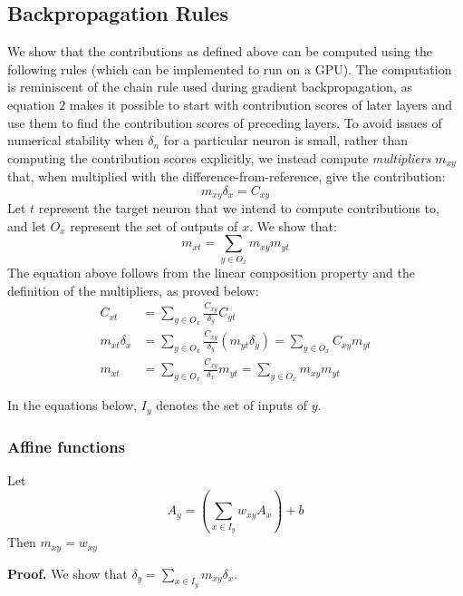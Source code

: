 \documentclass{article}
\begin{document}
\subsection{Backpropagation Rules}

We show that the contributions as defined above can be computed using the following rules (which can be implemented to run on a GPU). The computation is reminiscent of the chain rule used during gradient backpropagation, as equation $2$ makes it possible to start with contribution scores of later layers and use them to find the contribution scores of preceding layers. To avoid issues of numerical stability when $\delta_n$ for a particular neuron is small, rather than computing the contribution scores explicitly, we instead compute \emph{multipliers} $m_{xy}$ that, when multiplied with the difference-from-reference, give the contribution:
\begin{equation}
m_{xy} \delta_x = C_{xy}
\end{equation} 
Let $t$ represent the target neuron that we intend to compute contributions to, and let $O_x$ represent the set of outputs of $x$. We show that:
\begin{equation}
m_{xt} = \sum_{y \in O_x} m_{xy}m_{yt}
\end{equation} 
The equation above follows from the linear composition property and the definition of the multipliers, as proved below:
\begin{equation}
\begin{aligned}
C_{xt} &= \sum_{y \in O_x} \frac{C_{xy}}{\delta_y}C_{yt}\\
m_{xt} \delta_x &= \sum_{y \in O_x} \frac{C_{xy}}{\delta_y}(m_{yt} \delta_y) = \sum_{y \in O_x} C_{xy}m_{yt}\\
m_{xt} &= \sum_{y \in O_x} \frac{C_{xy}}{\delta_x}m_{yt} = \sum_{y \in O_x} m_{xy} m_{yt}
\end{aligned}
\end{equation}

In the equations below, $I_y$ denotes the set of inputs of $y$.

\subsubsection{Affine functions}
Let
\begin{equation}
A_y = \left(\sum_{x \in I_y} w_{xy} A_x\right) + b  
\end{equation}
Then $m_{xy} = w_{xy}$

{\bf Proof.} We show that $\delta_y = \sum_{x \in I_y} m_{xy} \delta_x$.
\end{document}
